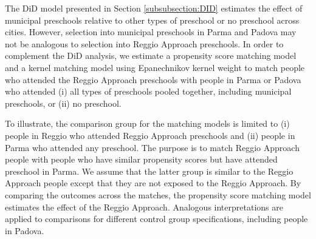 The DiD model presented in Section \ref{subsubsection:DID} estimates the effect of municipal preschools relative to other types of preschool or no preschool across cities. However, selection into municipal preschools in Parma and Padova may not be analogous to selection into Reggio Approach preschools. In order to complement the DiD analysis, we estimate a propensity score matching model and a kernel matching model using Epanechnikov kernel weight to match people who attended the Reggio Approach preschools with people in Parma or Padova who attended (i) all types of preschools pooled together, including municipal preschools, or (ii) no preschool.

To illustrate, the comparison group for the matching models is limited to (i) people in Reggio who attended Reggio Approach preschools and (ii) people in Parma who attended any preschool. The purpose is to match Reggio Approach people with people who have similar propensity scores but have attended preschool in Parma. We assume that the latter group is similar to the Reggio Approach people except that they are not exposed to the Reggio Approach. By comparing the outcomes across the matches, the propensity score matching model estimates the effect of the Reggio Approach. Analogous interpretations are applied to comparisons for different control group specifications, including people in Padova. 

